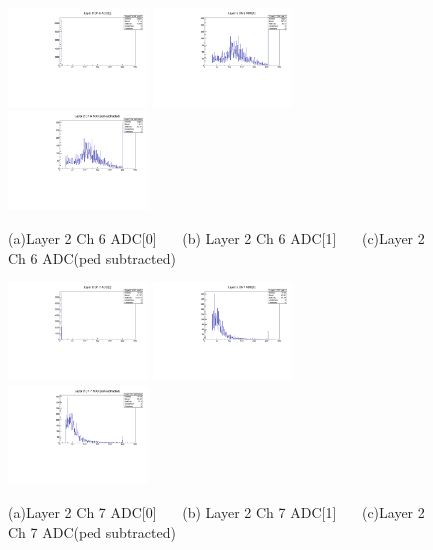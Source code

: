 \documentclass[a4paper,11pt]{article}
\theoremstyle{mytheor}
\begin{document}
\begin{figure}[H] 
\vspace*{-0.3cm} 
\includegraphics[width=0.33\textwidth,scale=0.5,trim=0 0 0 0,clip]{plotsdir/file0_muons-Layer2_Ch6_adc0-1.pdf} 
\includegraphics[width=0.33\textwidth,scale=0.5,trim=0 0 0 0,clip]{plotsdir/file0_muons-Layer2_Ch6_adc1-1.pdf} 
\includegraphics[width=0.33\textwidth,scale=0.5,trim=0 0 0 0,clip]{plotsdir/file0_muons-Layer2_Ch6_adcPedsub-1.pdf} 
\caption{(a)Layer 2 Ch 6 ADC[0] ~~~(b) Layer 2 Ch 6 ADC[1] ~~~(c)Layer 2 Ch 6 ADC(ped subtracted) } 
\end{figure} 
\begin{figure}[H] 
\vspace*{-0.3cm} 
\includegraphics[width=0.33\textwidth,scale=0.5,trim=0 0 0 0,clip]{plotsdir/file0_muons-Layer2_Ch7_adc0-1.pdf} 
\includegraphics[width=0.33\textwidth,scale=0.5,trim=0 0 0 0,clip]{plotsdir/file0_muons-Layer2_Ch7_adc1-1.pdf} 
\includegraphics[width=0.33\textwidth,scale=0.5,trim=0 0 0 0,clip]{plotsdir/file0_muons-Layer2_Ch7_adcPedsub-1.pdf} 
\caption{(a)Layer 2 Ch 7 ADC[0] ~~~(b) Layer 2 Ch 7 ADC[1] ~~~(c)Layer 2 Ch 7 ADC(ped subtracted) } 
\end{figure} 
\end{document}
